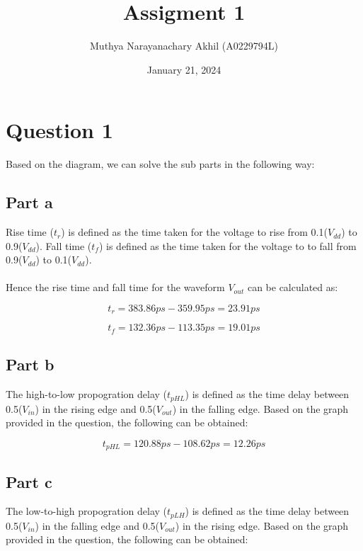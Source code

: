 \documentclass{article}
\title{Assigment 1}
\author{Muthya Narayanachary Akhil (A0229794L)}
\date{January 21, 2024}
\begin{document}
\maketitle
\section*{Question 1}
Based on the diagram, we can solve the sub parts in the following way:

\subsection*{Part a}

Rise time ($t_{r}$) is defined as the time taken for the voltage to rise from 0.1($V_{dd}$) to 0.9($V_{dd}$).
Fall time ($t_{f}$) is defined as the time taken for the voltage to to fall from 0.9($V_{dd}$) to 0.1($V_{dd}$).
\\\\Hence the rise time and fall time for the waveform $V_{out}$ can be calculated as:

\begin{equation}
    t_{r} = 383.86ps - 359.95ps = 23.91ps
\end{equation}

\begin{equation}
    t_{f} = 132.36ps - 113.35ps = 19.01ps
\end{equation}

\subsection*{Part b}
The high-to-low propogration delay ($t_{pHL}$) is defined as the time delay between 0.5($V_{in}$) in the rising edge and 0.5($V_{out}$) in the falling edge.
Based on the graph provided in the question, the following can be obtained:

\begin{equation}
    t_{pHL} = 120.88ps - 108.62ps = 12.26ps
\end{equation}

\subsection*{Part c}
The low-to-high propogration delay ($t_{pLH}$) is defined as the time delay between 0.5($V_{in}$) in the falling edge and 0.5($V_{out}$) in the rising edge.
Based on the graph provided in the question, the following can be obtained:
\end{document}
